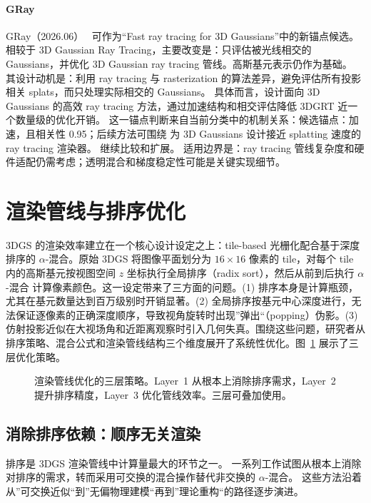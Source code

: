 \paragraph{GRay}
GRay（2026.06）~\cite{2606_30869} 可作为“Fast ray tracing for 3D Gaussians”中的新锚点候选。相较于 3D Gaussian Ray Tracing，主要改变是：只评估被光线相交的 Gaussians，并优化 3D Gaussian ray tracing 管线。高斯基元表示仍作为基础。
其设计动机是：利用 ray tracing 与 rasterization 的算法差异，避免评估所有投影相关 splats，而只处理实际相交的 Gaussians。
具体而言，设计面向 3D Gaussians 的高效 ray tracing 方法，通过加速结构和相交评估降低 3DGRT 近一个数量级的优化开销。
这一锚点判断来自当前分类中的机制关系：候选锚点：加速，且相关性 0.95；后续方法可围绕 为 3D Gaussians 设计接近 splatting 速度的 ray tracing 渲染器。 继续比较和扩展。
适用边界是：ray tracing 管线复杂度和硬件适配仍需考虑；透明混合和梯度稳定性可能是关键实现细节。
\section{渲染管线与排序优化}
\label{sec:02_6}

3DGS 的渲染效率建立在一个核心设计设定之上：tile-based 光栅化配合基于深度排序的 $\alpha$-混合。原始 3DGS 将图像平面划分为 $16\times16$ 像素的 tile，对每个 tile 内的高斯基元按视图空间 $z$ 坐标执行全局排序（radix sort），然后从前到后执行 $\alpha$-混合 计算像素颜色。这一设定带来了三方面的问题。(1) 排序本身是计算瓶颈，尤其在基元数量达到百万级别时开销显著。(2) 全局排序按基元中心深度进行，无法保证逐像素的正确深度顺序，导致视角旋转时出现”弹出“（popping）伪影。(3) 仿射投影近似在大视场角和近距离观察时引入几何失真。围绕这些问题，研究者从排序策略、混合公式和渲染管线结构三个维度展开了系统性优化。图~\ref{fig:02_pipeline_opt} 展示了三层优化策略。

\begin{figure}[htbp]
\centering
\resizebox{0.85\textwidth}{!}{}
\caption{渲染管线优化的三层策略。Layer~1 从根本上消除排序需求，Layer~2 提升排序精度，Layer~3 优化管线效率。三层可叠加使用。}
\label{fig:02_pipeline_opt}
\end{figure}

\subsection{消除排序依赖：顺序无关渲染}

排序是 3DGS 渲染管线中计算量最大的环节之一。
一系列工作试图从根本上消除对排序的需求，转而采用可交换的混合操作替代非交换的 $\alpha$-混合。
这些方法沿着从”可交换近似“到”无偏物理建模“再到”理论重构“的路径逐步演进。

